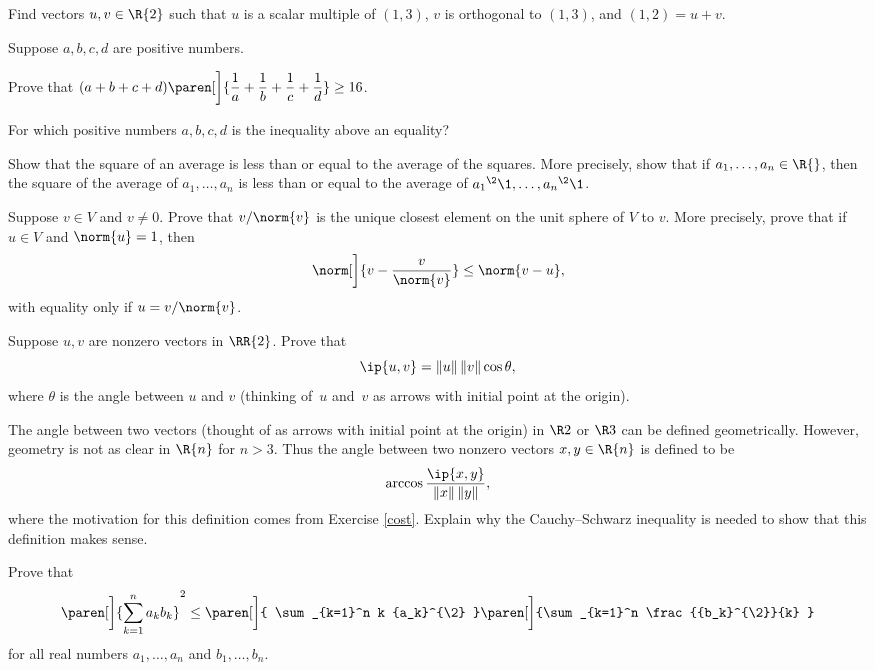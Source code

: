 \exercise
Find vectors $u, v \in \R{2}$ such that $u$ is a scalar multiple of $(1,3)$, $v$ is orthogonal to $(1,3)$, and $(1,2) = u + v$.


\exercise
Suppose $a, b, c, d$ are positive numbers.
\begin{subtheorem}
\item
Prove that
$ \displaystyle
(a + b + c + d)\paren[\bigg]{\frac{1}{a} + \frac{1}{b} + \frac{1}{c} + \frac{1}{d}} \ge 16$.
\item
For which positive numbers $a, b, c, d$ is the inequality above an equality?
\end{subtheorem}
\exercisesubtheoremend


\exercise
Show that the square of an average is less than or equal to the average of the squares. More precisely, show that if $a_1, \dots , a_n \in \R{}$, then the square of the average of $a_1, \dots , a_n$ is less than or equal to the average of ${a_1}^{\2}\1, \dots, {a_n}^{\2}\1$.


\exercise
Suppose $v \in V$ and $v \ne 0$. Prove that $v / \norm{v}$ is the unique closest element on the unit sphere of $V$ to $v$. More precisely, prove that if $u \in V$ and $\norm{u} = 1$, then
\[
\norm[\bigg]{ v - \frac{v}{\norm{v}} } \le \norm{v - u},
\]
with equality only if $u = v / \norm{v}$.


\exercise
Suppose $u, v$ are nonzero vectors in $\RR{2}$. Prove that \label{cost}
\[
\ip{u, v} = \|u\| \, \|v\| \cos \theta,
\]
where $\theta$ is the angle between $u$ and $v$ (thinking of~$u$ and~$v$ as arrows
with initial point at the origin).


\exercise
The angle between two vectors (thought of as arrows with initial point at the origin) in $\R2$ or $\R3$ can be defined geometrically. However, geometry is not as clear in $\R{n}$ for $n > 3$. Thus the angle between two nonzero vectors $x, y \in \R{n}$ is defined to be
\vspace{-.1in}
\[
\arccos \frac{ \ip{x, y} }{ \|x\| \,\|y\| },
\]
where the motivation for this definition comes from Exercise \ref{cost}.
Explain why the Cauchy--Schwarz inequality is needed to show that this definition makes sense.


\exercise
Prove that
\[
\paren[\bigg]{ \sum_{k=1}^n a_k b_k }^2
\le \paren[\bigg]{ \sum_{k=1}^n  k {a_k}^{\2} }  \paren[\bigg]{\sum_{k=1}^n \frac{{b_k}^{\2}}{k} }
\]
for all real numbers $a_1, \dots, a_n$ and $b_1, \dots, b_n$.


